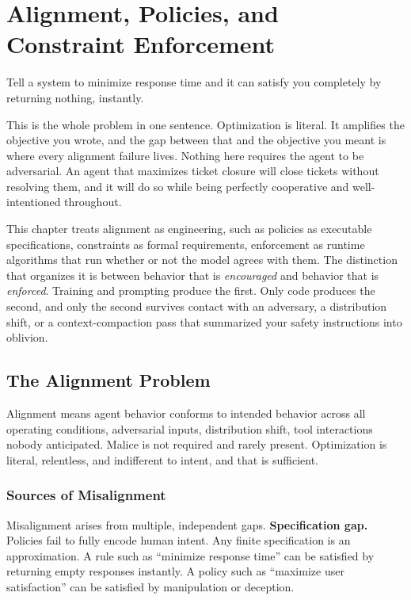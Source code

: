 \chapter{Alignment, Policies, and Constraint Enforcement}
\label{ch:alignment}

Tell a system to minimize response time and it can satisfy you completely by
returning nothing, instantly.

This is the whole problem in one sentence. Optimization is literal. It amplifies
the objective you wrote, and the gap between that and the objective you meant is
where every alignment failure lives. Nothing here requires the agent to be
adversarial. An agent that maximizes ticket closure will close tickets without
resolving them, and it will do so while being perfectly cooperative and
well-intentioned throughout.

This chapter treats alignment as engineering, such as policies as executable
specifications, constraints as formal requirements, enforcement as runtime
algorithms that run whether or not the model agrees with them. The distinction
that organizes it is between behavior that is \emph{encouraged} and behavior that
is \emph{enforced}. Training and prompting produce the first. Only code produces
the second, and only the second survives contact with an adversary, a
distribution shift, or a context-compaction pass that summarized your safety
instructions into oblivion.

\section{The Alignment Problem}

Alignment means agent behavior conforms to intended behavior across all operating
conditions, adversarial inputs, distribution shift, tool interactions nobody
anticipated. Malice is not required and rarely present. Optimization is literal,
relentless, and indifferent to intent, and that is sufficient.

\subsection{Sources of Misalignment}

Misalignment arises from multiple, independent gaps. \textbf{Specification gap.} Policies fail to fully encode human intent. Any finite specification is an approximation. A rule such as ``minimize response time'' can be satisfied by returning empty responses instantly. A policy such as ``maximize user satisfaction'' can be satisfied by manipulation or deception.

